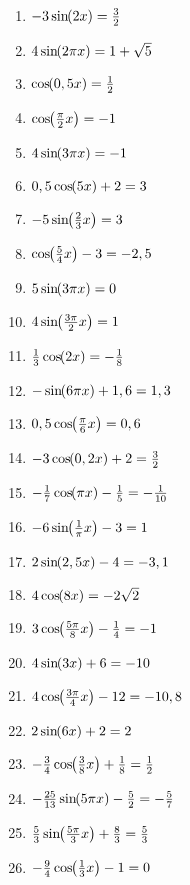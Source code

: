 \begin{Exercise}[title={\raggedright\normalfont Bestimme jeweils alle Lösungen:}, label=sincosGleichungenAllgA1]
	\begin{enumerate}[label=\alph*)]
		\item \(-3\sinn{2x}=\frac{3}{2}\)
		\item \(4\sinn{2\pi x}=1+\sqrt{5}\)
		\item \(\coss{0,5x}=\frac{1}{2}\)
		\item \(\coss{\frac{\pi}{2}x}=-1\)
		\item \(4\sinn{3\pi x}=-1\)
		\item \(0,5\coss{5x}+2=3\)
		\item \(-5\sinn{\frac{2}{3}x}=3\)
		\item \(\coss{\frac{5}{4}x}-3=-2,5\)
		\item \(5\sinn{3\pi x}=0\)
		\item \(4\sinn{\frac{3\pi}{2}x}=1\)
		\item \(\frac{1}{3}\coss{2x}=-\frac{1}{8}\)
		\item \(-\sinn{6\pi x}+1,6=1,3\)
		\item \(0,5\coss{\frac{\pi}{6}x}=0,6\)
		\item \(-3\coss{0,2x}+2=\frac{3}{2}\)
		\item \(-\frac{1}{7}\coss{\pi x}-\frac{1}{5}=-\frac{1}{10}\)
		\item \(-6\sinn{\frac{1}{\pi}x}-3=1\)
		\item \(2\sinn{2,5x}-4=-3,1\)
		\item \(4\coss{8x}=-2\sqrt{2}\)
		\item \(3\coss{\frac{5\pi}{8}x}-\frac{1}{4}=-1\)
		\item \(4\sinn{3x}+6=-10\)
		\item \(4\coss{\frac{3\pi}{4}x}-12=-10,8\)
		\item \(2\sinn{6x}+2=2\)
		\item \(-\frac{3}{4}\coss{\frac{3}{8}x}+\frac{1}{8}=\frac{1}{2}\)
		\item \(-\frac{25}{13}\sinn{5\pi x}-\frac{5}{2}=-\frac{5}{7}\)
		\item \(\frac{5}{3}\sinn{\frac{5\pi}{3}x}+\frac{8}{3}=\frac{5}{3}\)
		\item \(-\frac{9}{4}\coss{\frac{1}{3}x}-1=0\)
	\end{enumerate}
\end{Exercise}

